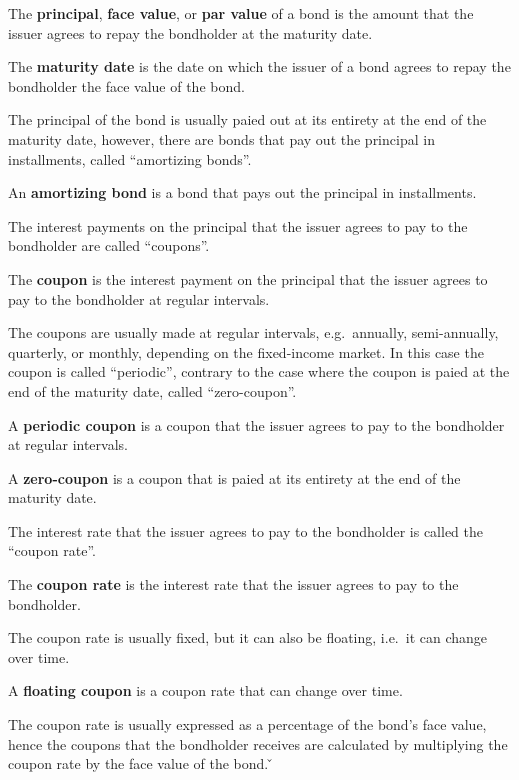 The \textbf{principal}, \textbf{face value}, or \textbf{par value} of a bond is the amount that the issuer agrees to
repay the bondholder at the maturity date.
\ed

The \textbf{maturity date} is the date on which the issuer of a bond agrees to repay the bondholder the face value of
the bond.
\ed

The principal of the bond is usually paied out at its entirety at the end of the maturity date, however, there are
bonds that pay out the principal in installments, called ``amortizing bonds''.

An \textbf{amortizing bond} is a bond that pays out the principal in installments.
\ed

The interest payments on the principal that the issuer agrees to pay to the bondholder are called ``coupons''.

\bd[Coupon]
The \textbf{coupon} is the interest payment on the principal that the issuer agrees to pay to the bondholder at regular
intervals.
\ed

The coupons are usually made at regular intervals, e.g.\ annually, semi-annually, quarterly, or monthly, depending on
the fixed-income market. In this case the coupon is called ``periodic'', contrary to the case where the coupon is paied
at the end of the maturity date, called ``zero-coupon''.

A \textbf{periodic coupon} is a coupon that the issuer agrees to pay to the bondholder at regular intervals.
\ed

A \textbf{zero-coupon} is a coupon that is paied at its entirety at the end of the maturity date.
\ed

The interest rate that the issuer agrees to pay to the bondholder is called the ``coupon rate''.

The \textbf{coupon rate} is the interest rate that the issuer agrees to pay to the bondholder.
\ed

The coupon rate is usually fixed, but it can also be floating, i.e.\ it can change over time.

A \textbf{floating coupon} is a coupon rate that can change over time.
\ed

The coupon rate is usually expressed as a percentage of the bond's face value, hence the coupons that the bondholder
receives are calculated by multiplying the coupon rate by the face value of the bond. \v

